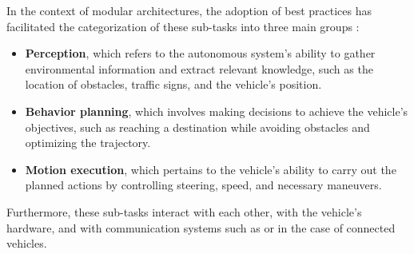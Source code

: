 
In the context of modular architectures, the adoption of best practices has facilitated the categorization of these \mbox{sub-tasks} into three main groups \cite{machines5010006}\cite{functional_architectures}:  

\begin{itemize}  
    \item \textbf{Perception}, which refers to the autonomous system's ability to gather environmental information and extract relevant knowledge, such as the location of obstacles, traffic signs, and the vehicle’s position.  
    \item \textbf{Behavior planning}, which involves making decisions to achieve the vehicle's objectives, such as reaching a destination while avoiding obstacles and optimizing the trajectory.  
    \item \textbf{Motion execution}, which pertains to the vehicle’s ability to carry out the planned actions by controlling steering, speed, and necessary maneuvers.  
\end{itemize}

Furthermore, these \mbox{sub-tasks} interact with each other, with the vehicle's hardware, and with communication systems such as  or  in the case of connected vehicles.

